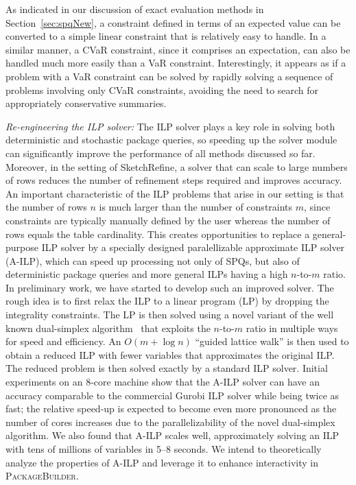 \documentclass[11pt]{article}
\newcommand{\pb}{\textsc{PackageBuilder}\xspace}
\newcommand{\skref}{{\sc SketchRefine}\xspace}
\begin{document}
As indicated in our discussion of exact evaluation methods in Section~\ref{sec:spqNew}, a constraint defined in terms of an expected value can be converted to a simple linear constraint that is relatively easy to handle. In a similar manner, a CVaR constraint, since it comprises an expectation, can also be handled much more easily than a VaR constraint. Interestingly, it appears as if a problem with a VaR constraint can be solved by rapidly solving a sequence of problems involving only CVaR constraints, avoiding the need to search for appropriately conservative summaries. 

\smallskip

\emph{Re-engineering the ILP solver:} The ILP solver plays a key role in solving both deterministic and stochastic package queries, so speeding up the solver module can significantly  improve the performance of all methods discussed so far. Moreover, in the setting of \skref, a solver that can scale to large numbers of rows reduces the number of refinement steps required and improves accuracy. An important characteristic of the ILP problems that arise in our setting is that the number of rows $n$ is much larger than the number of constraints $m$, since constraints are typically manually defined by the user whereas the number of rows equals the table cardinality. This creates opportunities to replace a general-purpose ILP solver by a specially designed paralellizable approximate ILP solver (A-ILP), which can speed up processing not only of SPQs, but also of deterministic package queries and more general ILPs having a high $n$-to-$m$ ratio. In preliminary work, we have started to develop such an improved solver. The rough idea is to first relax the ILP to a linear program (LP) by dropping the integrality constraints. The LP is then solved using a novel variant of the well known dual-simplex algorithm~\cite{vanderbei2020linear} that exploits the $n$-to-$m$ ratio in multiple ways for speed and efficiency. An $O(m+\log n)$ ``guided lattice walk'' is then used to obtain a reduced ILP with fewer variables that approximates the original ILP. The reduced problem is then solved exactly by a standard ILP solver. Initial experiments on an 8-core machine show that the A-ILP solver can have an accuracy comparable to the commercial Gurobi ILP solver while being twice as fast; the relative speed-up is expected to become even more pronounced as the number of cores increases due to the parallelizability of the novel dual-simplex algorithm. We also found that A-ILP scales well, approximately solving an ILP with tens of millions of variables in 5--8 seconds. We intend to theoretically analyze the properties of A-ILP and leverage it to enhance interactivity in \pb.
\end{document}
